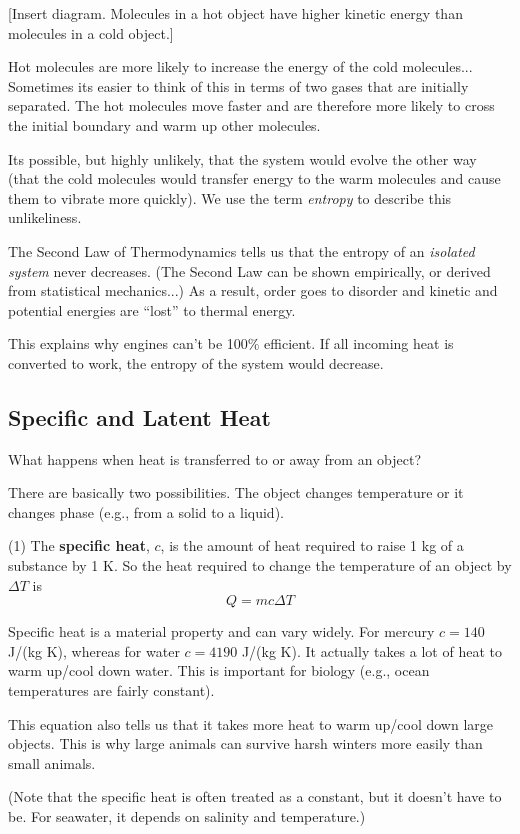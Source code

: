 [Insert diagram. Molecules in a hot object have higher kinetic energy than molecules in a cold object.]
\vspace{5cm}

Hot molecules are more likely to increase the energy of the cold molecules... Sometimes its easier to think of this in terms of two gases that are initially separated. The hot molecules move faster and are therefore more likely to cross the initial boundary and warm up other molecules.

Its possible, but highly unlikely, that the system would evolve the other way (that the cold molecules would transfer energy to the warm molecules and cause them to vibrate more quickly). We use the term \textit{entropy} to describe this unlikeliness.

The Second Law of Thermodynamics tells us that the entropy of an \textit{isolated system} never decreases. (The Second Law can be shown empirically, or derived from statistical mechanics...) As a result, order goes to disorder and kinetic and potential energies are ``lost'' to thermal energy.

This explains why engines can't be 100\% efficient. If all incoming heat is converted to work, the entropy of the system would decrease.

\subsection{Specific and Latent Heat}
What happens when heat is transferred to or away from an object?

There are basically two possibilities. The object changes temperature or it changes phase (e.g., from a solid to a liquid).

(1) The \textbf{specific heat}, $c$, is the amount of heat required to raise 1 kg of a substance by 1 K. So the heat required to change the temperature of an object by $\Delta{T}$ is
$$\boxed{Q=mc\Delta{T}}$$

Specific heat is a material property and can vary widely. For mercury $c=140$ J/(kg K), whereas for water $c=4190$ J/(kg K). It actually takes a lot of heat to warm up/cool down water. This is important for biology (e.g., ocean temperatures are fairly constant).

This equation also tells us that it takes more heat to warm up/cool down large objects. This is why large animals can survive harsh winters more easily than small animals.

(Note that the specific heat is often treated as a constant, but it doesn't have to be. For seawater, it depends on salinity and temperature.)
\bigskip

